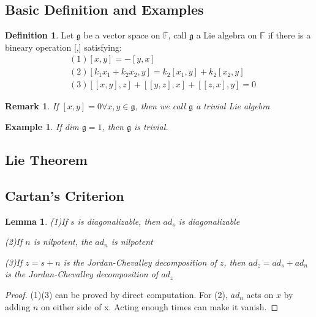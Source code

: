 \documentclass{book}
\newtheorem{lemma}{Lemma}[section]
\newtheorem{example}{Example}[section]
\newtheorem*{remark}{Remark}
\theoremstyle{definition}
\newtheorem{definition}{Definition}[section]
\begin{document}
\subsection{Basic Definition and Examples}
\begin{definition}
Let $\mathfrak{g}$ be a vector space on $\mathbb{F}$, call $\mathfrak{g}$ a Lie algebra on $\mathbb{F}$ if there is a bineary operation [,] satisfying:
\begin{align*}
&(1)[x,y]=-[y,x]\\
&(2)[k_1x_1+k_2x_2,y]=k_2[x_1,y]+k_2[x_2,y]\\
&(3)[[x,y],z]+[[y,z],x]+[[z,x],y]=0
\end{align*}
\end{definition}
\begin{remark}
If $[x,y]=0\forall x,y\in\mathfrak{g}$, then we call $\mathfrak{g}$ a trivial Lie algebra
\end{remark}
\begin{example}
If dim $\mathfrak{g}=1$, then $\mathfrak{g}$ is trivial.
\end{example}
\subsection{Lie Theorem}

\subsection{Cartan's Criterion}
\begin{lemma}
(1)If $s$ is diagonalizable, then $ad_s$ is diagonalizable\par
(2)If $n$ is nilpotent, the $ad_n$ is nilpotent\par
(3)If $z=s+n$ is the Jordan-Chevalley decomposition of $z$, then $ad_z=ad_s+ad_n$ is the Jordan-Chevalley decomposition of $ad_z$
\end{lemma}
\begin{proof}
(1)(3) can be proved by direct computation. For (2), $ad_n$ acts on $x$ by adding $n$ on either side of x. Acting enough times can make it vanish.
\end{proof}
\end{document}
